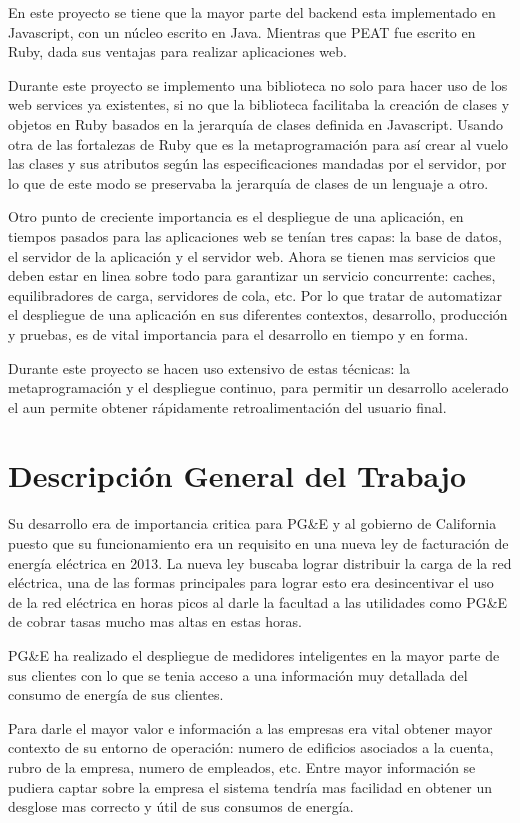 \documentclass{article}
\begin{document}
En este proyecto se tiene que la mayor parte del backend esta implementado
en Javascript, con un núcleo escrito en Java. Mientras que PEAT fue escrito
en Ruby, dada sus ventajas para realizar aplicaciones web.

Durante este proyecto se implemento una biblioteca no solo para hacer uso de
los web services ya existentes, si no que la biblioteca facilitaba la creación
de clases y objetos en Ruby basados en la jerarquía de clases definida
en Javascript. Usando otra de las fortalezas de Ruby que es la metaprogramación
para así crear al vuelo las clases y sus atributos según las especificaciones
mandadas por el servidor, por lo que de este modo se preservaba la jerarquía
de clases de un lenguaje a otro.

Otro punto de creciente importancia es el despliegue de una aplicación, en tiempos
pasados para las aplicaciones web se tenían tres capas: la base de datos,
el servidor de la aplicación y el servidor web. Ahora se tienen mas servicios
que deben estar en linea sobre todo para garantizar un servicio concurrente:
caches, equilibradores de carga, servidores de cola, etc. Por lo que tratar
de automatizar el despliegue de una aplicación en sus diferentes contextos,
desarrollo, producción y pruebas, es de vital importancia para el desarrollo
en tiempo y en forma.

Durante este proyecto se hacen uso extensivo de estas técnicas: la metaprogramación
y el despliegue continuo, para permitir un desarrollo acelerado el aun permite
obtener rápidamente retroalimentación del usuario final.

\section{Descripción General del Trabajo}
Su desarrollo era de importancia critica para PG\&E y al gobierno de
California puesto que su funcionamiento era un requisito en una nueva
ley de facturación de energía eléctrica en 2013. La nueva ley buscaba
lograr distribuir la carga de la red eléctrica, una de las formas
principales para lograr esto era desincentivar el uso de la red
eléctrica en horas picos al darle la facultad a las utilidades como PG\&E
de cobrar tasas mucho mas altas en estas horas.


PG\&E ha realizado el despliegue de medidores inteligentes en la
mayor parte de sus clientes con lo que se tenia acceso a una información
muy detallada del consumo de energía de sus clientes.

Para darle el mayor valor e información a las empresas era
vital obtener mayor contexto de su entorno de operación: numero
de edificios asociados a la cuenta, rubro de la empresa, numero de
empleados, etc. Entre mayor información se pudiera captar sobre la
empresa el sistema tendría mas facilidad en obtener un desglose
mas correcto y útil de sus consumos de energía.
\end{document}
